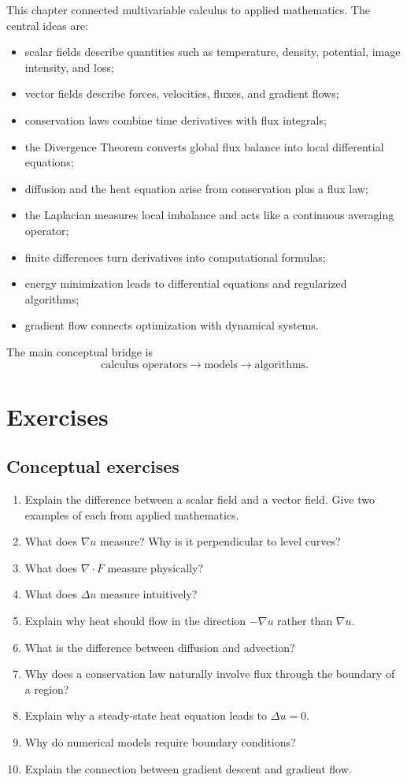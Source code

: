 \documentclass[11pt]{article}
\newcommand{\grad}{\nabla}
\newcommand{\Div}{\nabla\!\cdot}
\newcommand{\Lap}{\Delta}
\begin{document}
This chapter connected multivariable calculus to applied mathematics. The central ideas are:
\begin{itemize}
  \item scalar fields describe quantities such as temperature, density, potential, image intensity, and loss;
  \item vector fields describe forces, velocities, fluxes, and gradient flows;
  \item conservation laws combine time derivatives with flux integrals;
  \item the Divergence Theorem converts global flux balance into local differential equations;
  \item diffusion and the heat equation arise from conservation plus a flux law;
  \item the Laplacian measures local imbalance and acts like a continuous averaging operator;
  \item finite differences turn derivatives into computational formulas;
  \item energy minimization leads to differential equations and regularized algorithms;
  \item gradient flow connects optimization with dynamical systems.
\end{itemize}
The main conceptual bridge is
\[
\text{calculus operators}\longrightarrow \text{models}\longrightarrow \text{algorithms}.
\]

\section{Exercises}

\subsection*{Conceptual exercises}
\begin{enumerate}
  \item Explain the difference between a scalar field and a vector field. Give two examples of each from applied mathematics.
  \item What does $\grad u$ measure? Why is it perpendicular to level curves?
  \item What does $\Div F$ measure physically?
  \item What does $\Lap u$ measure intuitively?
  \item Explain why heat should flow in the direction $-\grad u$ rather than $\grad u$.
  \item What is the difference between diffusion and advection?
  \item Why does a conservation law naturally involve flux through the boundary of a region?
  \item Explain why a steady-state heat equation leads to $\Lap u=0$.
  \item Why do numerical models require boundary conditions?
  \item Explain the connection between gradient descent and gradient flow.
\end{enumerate}
\end{document}
